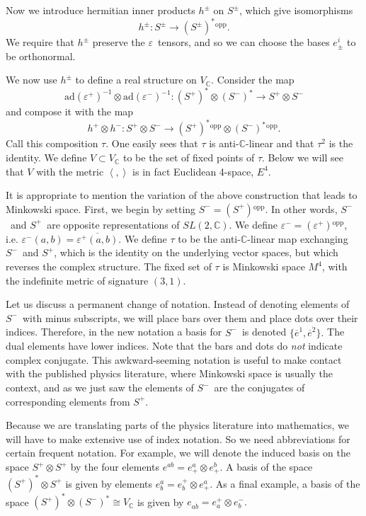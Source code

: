 \documentclass[twoside]{amsart}
\newcommand{\CC}{\ensuremath{\mathbb{C}}}
\renewcommand{\epsilon}{\varepsilon}
\newcommand{\enm}[1]{\ensuremath{#1}}
\newcommand{\ip}[2]{\enm{\left<#1,#2\right>}}
\renewcommand{\bar}[1]{\overline{#1}}
\newcommand{\ad}{\enm{\mathrm{ad}}}
\newcommand{\spl}{\enm{S^{+}}}
\newcommand{\sm}{\enm{S^{-}}}
\newcommand{\spm}{\enm{S^{\pm}}}
\newcommand{\spd}{\enm{(\spl)^{*}}}
\newcommand{\smd}{\enm{(\sm)^{*}}}
\newcommand{\eps}{\enm{\epsilon}}
\newcommand{\ei}[1]{\enm{e^{#1}_{+}}}
\newcommand{\eil}[1]{\enm{e_{#1}^{+}}}
\newcommand{\eilb}[1]{\enm{e_{#1}^{-}}}
\renewcommand{\epsilon}{\varepsilon}
\newcommand{\opp}[1]{\enm{{#1}{}^{\mathrm{opp}}}}
\newcommand{\bothupperabc}[3]{\enm{{#1}^{#2 #3}}}
\newcommand{\bothlowerabc}[3]{\enm{{#1}_{#2 #3}}}
\newcommand{\upperlowerabc}[3]{\enm{{#1}^{#2}_{#3}}}
\newcommand{\dotbothlowerabc}[3]{\bothlowerabc{#1}{#2}{\dot{#3}}}
\newcommand{\euu}[2]{\bothupperabc{e}{#1}{#2}}
\newcommand{\eul}[2]{\upperlowerabc{e}{#1}{#2}}
\newcommand{\eldl}[2]{\dotbothlowerabc{e}{#1}{#2}}
\begin{document}
Now we introduce hermitian inner products \( h^{\pm} \) on \spm, which
give isomorphisms
\[ h^{\pm}: \spm\to \opp{(\spm)^{*}}. \]
We require that \( h^{\pm} \) preserve the \eps\ tensors, and so we
can choose the bases \( e^{i}_{\pm} \) to be orthonormal.

We now use \( h^{\pm} \) to define a real structure on \( V_{\CC} \).
Consider the map
\[ \ad(\eps^{+})^{-1} \otimes \ad(\eps^{-})^{-1}:
\spd\otimes\smd\to \spl\otimes\sm \]
and compose it with the map
\[ h^{+}\otimes h^{-}: \spl\otimes \sm\to \opp{\spd}\otimes
\opp{\smd}. \]
Call this composition \( \tau \).  One easily sees that
\( \tau \) is anti-\CC-linear and that
\( \tau^{2}
\) is the identity.  We define \( V\subset V_{\CC} \) to be the set
of
fixed points of \( \tau \). Below we will see that \( V \) with the metric \ip{}{} is in fact Euclidean 4-space, \( E^4 \).

It is appropriate to mention the variation of the above construction
that leads to Minkowski space.  First, we begin by setting \(
\sm=\opp{(\spl)}.  \) In other words, \sm\ and \spl\ are opposite
representations of \( SL(2,\CC).  \) We define \( \eps^{-} =
\opp{(\eps^{+})} \), i.e. \( \eps^{-}(a,b) = \overline{\eps^{+}(a,b)}
\).  We define \( \tau \) to be the anti-\CC-linear map exchanging
\sm\ and \spl, which is the identity on the underlying vector spaces,
but which reverses the complex structure.  The fixed set of \( \tau \)
is Minkowski space \(M^4\), with the indefinite metric
of signature \( (3,1). \)

Let us discuss a permanent change of notation.  Instead of denoting
elements of \sm\ with minus subscripts, we will place bars over them
and place dots over their indices.  Therefore, in the new notation a
basis for \sm\ is denoted \( \{\bar{e}^{\dot{1}},
\bar{e}^{\dot{2}}\}.
\) The dual elements have lower indices.
Note that the bars and dots do \emph{not} indicate complex
conjugate.  This awkward-seeming notation is useful to make contact
with the published physics literature, where Minkowski space is
usually the context, and as we just saw the elements of \sm\ are the
conjugates of corresponding elements from \spl.

Because we are translating
parts of the physics literature into mathematics, we will have to
make
extensive use of index notation.  So we need abbreviations for
certain
frequent notation.  For example, we will denote the induced basis on
the space \( \spl\otimes\spl \) by the four elements \( \euu{a}{b} =
\ei{a}\otimes \ei{b}. \) A basis of the space \( \spd\otimes\spl \)
is
given by elements \( \eul{a}{b} = \eil{b}\otimes \ei{a}. \)  As a
final
example, a basis of the space \( \spd\otimes\smd\cong V_{\CC} \) is
given by \( \eldl{a}{b} = \eil{a}\otimes\eilb{b}. \)
\end{document}
